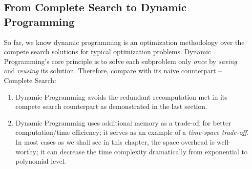 \documentclass[../main.tex]{subfiles}
\begin{document}
\subsection{From Complete Search to Dynamic Programming}
\label{subsec_cs_to_dp}
So far, we know dynamic programming is an optimization methodology over the compete search solutions for typical optimization problems. Dynamic Programming's core principle is to solve each subproblem only \textit{once} by \textit{saving} and \textit{reusing} its solution. Therefore, compare with its naive counterpart -- Complete Search:
\begin{enumerate}
\item Dynamic Programming avoids the redundant recomputation met in its compete search counterpart as demonstrated in the last section.
    \item Dynamic Programming uses additional memory as a trade-off for better computation/time efficiency; it serves as an example of a \textit{time-space trade-off}. In most cases as we shall see in this chapter, the space overhead is well-worthy; it can decrease the time complexity dramatically from exponential to polynomial level.
\end{enumerate}
\end{document}

